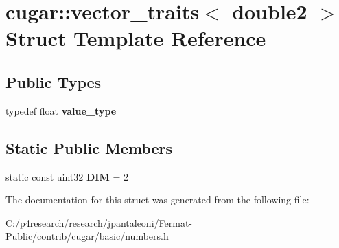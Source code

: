 \hypertarget{structcugar_1_1vector__traits_3_01double2_01_4}{}\section{cugar\+:\+:vector\+\_\+traits$<$ double2 $>$ Struct Template Reference}
\label{structcugar_1_1vector__traits_3_01double2_01_4}
\subsection*{Public Types}
\begin{DoxyCompactItemize}
\item 
\mbox{\label{structcugar_1_1vector__traits_3_01double2_01_4_ab77eec17327fbba6d8e61ac9926e02e9}} 
typedef float {\bfseries value\+\_\+type}
\end{DoxyCompactItemize}
\subsection*{Static Public Members}
\begin{DoxyCompactItemize}
\item 
\mbox{\label{structcugar_1_1vector__traits_3_01double2_01_4_af733ae3a54cd950c4b294605fe404a24}} 
static const uint32 {\bfseries D\+IM} = 2
\end{DoxyCompactItemize}


The documentation for this struct was generated from the following file\+:\begin{DoxyCompactItemize}
\item 
C\+:/p4research/research/jpantaleoni/\+Fermat-\/\+Public/contrib/cugar/basic/numbers.\+h\end{DoxyCompactItemize}
